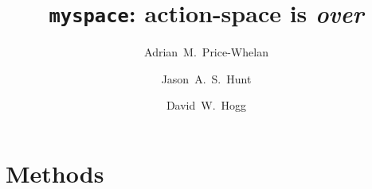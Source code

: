 \documentclass[modern]{aastex62}
\begin{document}
\sloppy\sloppypar\raggedbottom\frenchspacing %

\title{\textbf{\texttt{myspace}: action-space is \textsl{over}}}

\author[0000-0003-0872-7098]{Adrian~M.~Price-Whelan}

\author{Jason~A.~S.~Hunt}

\author[0000-0003-2866-9403]{David~W.~Hogg}

\begin{abstract}\noindent %
\end{abstract}







\section{Methods}
\label{sec:methods}
\end{document}
